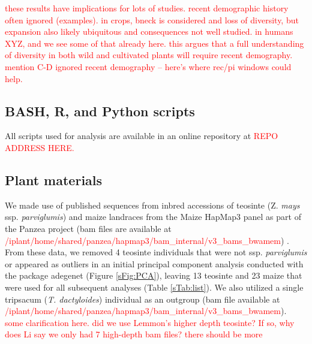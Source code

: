 \documentclass{pnastwo}
\newcommand{\jri}[1]{\textcolor{red}{\scriptsize #1}}
\begin{document}
\begin{article}
\DIFdelbegin {}\DIFdelend \DIFaddbegin \jri{these results have implications for lots of studies. recent demographic history often ignored (examples). in crops, bneck is considered and loss of diversity, but expansion also likely ubiquitous and consequences not well studied.  in humans XYZ, and we see some of that already here. this argues that a full understanding of diversity in both wild and cultivated plants will require recent demography. mention C-D ignored recent demography -- here's where rec/pi windows could help.}
\DIFaddend 

\DIFdelbegin 
\DIFdelend \begin{materials}

\subsection{BASH, R, and Python scripts}
All scripts used for analysis are available in an online repository at \textcolor{red}{REPO ADDRESS HERE.} 

\subsection{Plant materials}
We made use of published sequences from inbred accessions of teosinte (Z. \emph{mays} ssp. \emph{parviglumis}) and maize landraces from the Maize HapMap3 panel as part of the Panzea project (bam files are available at \textcolor{red}{/iplant/home/shared/panzea/hapmap3/bam\_internal/v3\_bams\_bwamem}) \cite{chia2012, lemmon2014,hapmap3}. 
From these data, we removed 4 teosinte individuals that were not ssp. \emph{parviglumis} or appeared as outliers in an initial principal component analysis conducted with the package adegenet \cite{jombart2011} (Figure \ref{sFig:PCA}), leaving 13 teosinte and 23 maize that were used for all subsequent analyses (Table \ref{sTab:list}). We also utilized a single tripsacum (\emph{T. dactyloides}) individual as an outgroup (bam file available at \textcolor{red}{/iplant/home/shared/panzea/hapmap3/bam\_internal/v3\_bams\_bwamem}). \DIFaddbegin \jri{some clarification here. did we use Lemmon's higher depth teosinte? If so, why does Li say we only had 7 high-depth bam files? there should be more}
\DIFaddend 


\end{materials}
\end{article}
\end{document}
